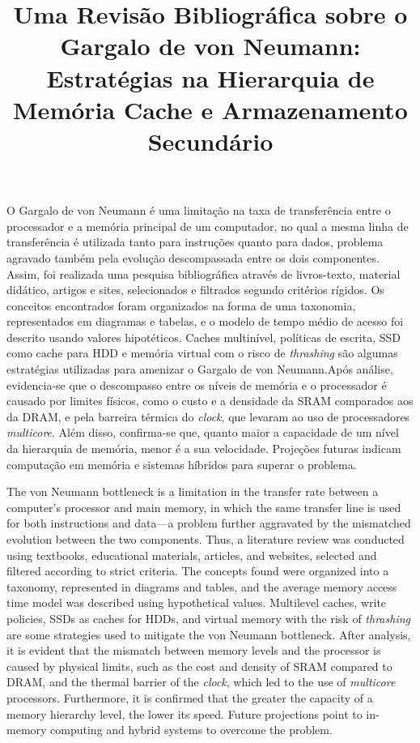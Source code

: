 \documentclass[portuguese]{sbcreviews-2025}%
\title[Template da SBC Reviews 2025 para artigos em português]{Uma Revisão Bibliográfica sobre o Gargalo de von Neumann: Estratégias na Hierarquia de Memória Cache e Armazenamento Secundário}
\begin{document}
\begin{frontmatter}

\maketitle

\begin{abstract-pt}
O Gargalo de von Neumann é uma limitação na taxa de transferência entre o
processador e a memória principal de um computador, no qual a mesma linha de
transferência é utilizada tanto para instruções quanto para dados, problema
agravado também pela evolução descompassada entre os dois componentes.
Assim, foi realizada uma pesquisa bibliográfica através de livros-texto,
material didático, artigos e sites, selecionados e filtrados segundo critérios
rígidos. Os conceitos encontrados foram organizados na forma de uma
taxonomia, representados em diagramas e tabelas, e o modelo
de tempo médio de acesso foi descrito usando valores hipotéticos. Caches multinível,
políticas de escrita, SSD como cache para HDD e memória virtual com o risco de
\textit{thrashing} são algumas estratégias utilizadas para amenizar o
Gargalo de von Neumann.Após análise, evidencia-se que o descompasso entre os níveis de 
memória e o processador é causado por limites físicos, como o custo e a densidade da 
SRAM comparados aos da DRAM, e pela barreira térmica do \textit{clock}, 
que levaram ao uso de processadores \textit{multicore}. 
Além disso, confirma-se que, quanto maior a capacidade de um nível da 
hierarquia de memória, menor é a sua velocidade. 
Projeções futuras indicam computação em memória e
sistemas híbridos para superar o problema.
\end{abstract-pt}

\begin{abstract-en}
The von Neumann bottleneck is a limitation in the transfer rate between a computer's processor 
and main memory, in which the same transfer line is used for both instructions and data—a problem further 
aggravated by the mismatched evolution between the two components. Thus, a literature review was conducted using textbooks, educational materials, articles, and websites,
selected and filtered according to strict criteria. The concepts 
found were organized into a taxonomy, represented in diagrams and tables, and the average memory access time model was 
described using hypothetical values. Multilevel caches, write policies, SSDs as caches for HDDs, and virtual memory 
with the risk of \textit{thrashing} are some strategies used to mitigate the von Neumann bottleneck. After analysis, it is evident 
that the mismatch between memory levels and the processor is caused by physical limits, such as the cost and density of SRAM 
compared to DRAM, and the thermal barrier of the \textit{clock}, which led to the use of  \textit{multicore} processors. Furthermore, it is confirmed 
that the greater the capacity of a memory hierarchy level, the lower its speed. Future projections point to in-memory computing and hybrid systems to overcome the problem.
\end{abstract-en}


\end{frontmatter}
\end{document}
